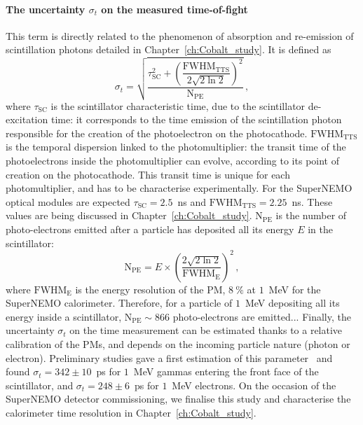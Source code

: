 \paragraph{The uncertainty $\sigma_{t}$ on the measured time-of-fight}
This term is directly related to the phenomenon of absorption and re-emission of scintillation photons detailed in Chapter~\ref{ch:Cobalt_study}.
It is defined as
\begin{equation}
  \sigma_{t}=\sqrt{\dfrac{\tau_{\text{SC}}^{2}+\left(\dfrac{\text{FWHM}_{\text{TTS}}}{2\sqrt{2\ln{2}}}\right)^{2}}{\text{N}_\text{PE}}}\,,
  \label{eq:sigma_t}
\end{equation}
where $\tau_{\text{SC}}$ is the scintillator characteristic time, due to the scintillator de-excitation time: it corresponds to the time emission of the scintillation photon responsible for the creation of the photoelectron on the photocathode.
$\text{FWHM}_{\text{TTS}}$ is the temporal dispersion linked to the photomultiplier: the transit time of the photoelectrons inside the photomultiplier can evolve, according to its point of creation on the photocathode.
This transit time is unique for each photomultiplier, and has to be characterise experimentally.
For the SuperNEMO optical modules are expected $\tau_{\text{SC}}=2.5$~ns and $\text{FWHM}_{\text{TTS}}=2.25$~ns.
These values are being discussed in Chapter~\ref{ch:Cobalt_study}.
$\text{N}_\text{PE}$ is the number of photo-electrons emitted after a particle has deposited all its energy $E$ in the scintillator:
\begin{equation}
  \text{N}_\text{PE} = E\times \left(\frac{2\sqrt{2\ln 2}}{\text{FWHM}_{\text{E}}}\right)^{2}\,,
\end{equation}
where $\text{FWHM}_{\text{E}}$ is the energy resolution of the PM, $8~\%$ at $1$~MeV for the SuperNEMO calorimeter.
Therefore, for a particle of $1$~MeV depositing all its energy inside a scintillator, $\text{N}_\text{PE}\sim 866$ photo-electrons are emitted...
Finally, the uncertainty $\sigma_{t}$ on the time measurement can be estimated thanks to a relative calibration of the PMs, and depends on the incoming particle nature (photon or electron).
Preliminary studies gave a first estimation of this parameter~\cite{HuberThesis} and found $\sigma_{t}=342\pm 10$~ps for $1$~MeV gammas entering the front face of the scintillator, and $\sigma_{t}=248\pm 6$~ps for $1$~MeV electrons.
On the occasion of the SuperNEMO detector commissioning, we finalise this study and characterise the calorimeter time resolution in Chapter~\ref{ch:Cobalt_study}.

